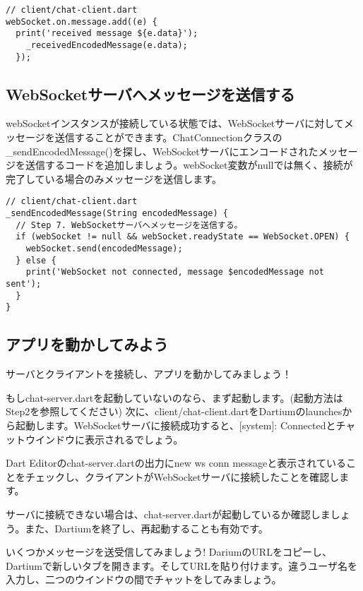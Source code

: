 \begin{verbatim}
// client/chat-client.dart
webSocket.on.message.add((e) {
  print('received message ${e.data}');
    _receivedEncodedMessage(e.data);
  });
\end{verbatim}

\subsection{WebSocketサーバへメッセージを送信する}

webSocketインスタンスが接続している状態では、WebSocketサーバに対してメッセージを送信することができます。ChatConnectionクラスの\_sendEncodedMessage()を探し、WebSocketサーバにエンコードされたメッセージを送信するコードを追加しましょう。webSocket変数がnullでは無く、接続が完了している場合のみメッセージを送信します。

\begin{verbatim}
// client/chat-client.dart
_sendEncodedMessage(String encodedMessage) {
  // Step 7. WebSocketサーバへメッセージを送信する。
  if (webSocket != null && webSocket.readyState == WebSocket.OPEN) {
    webSocket.send(encodedMessage);
  } else {
    print('WebSocket not connected, message $encodedMessage not sent');
  }
}
\end{verbatim}

\subsection{アプリを動かしてみよう}

サーバとクライアントを接続し、アプリを動かしてみましょう！

もしchat-server.dartを起動していないのなら、まず起動します。(起動方法はStep2を参照してください) 次に、client/chat-client.dartをDartiumのlaunchesから起動します。WebSocketサーバに接続成功すると、[system]: Connectedとチャットウインドウに表示されるでしょう。


Dart Editorのchat-server.dartの出力にnew ws conn messageと表示されていることをチェックし、クライアントがWebSocketサーバに接続したことを確認します。


サーバに接続できない場合は、chat-server.dartが起動しているか確認しましょう。また、Dartiumを終了し、再起動することも有効です。

いくつかメッセージを送受信してみましょう! DariumのURLをコピーし、Dartiumで新しいタブを開きます。そしてURLを貼り付けます。違うユーザ名を入力し、二つのウインドウの間でチャットをしてみましょう。

